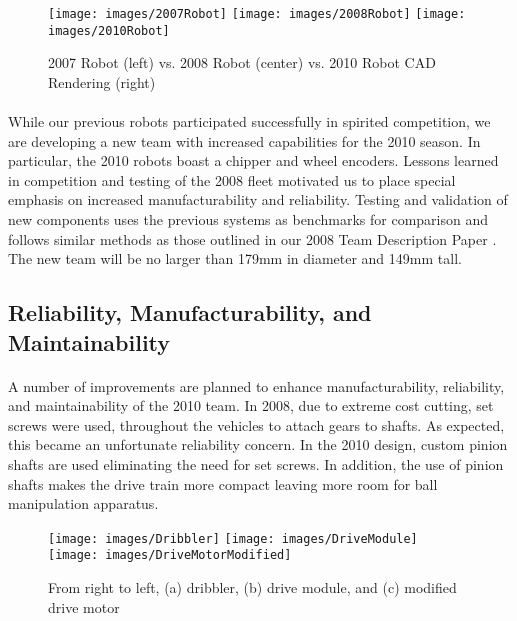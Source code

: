 \documentclass{llncs}
\begin{document}
\begin{figure} 
	\centering
	\vspace {0 cm}
	\texttt{[image: images/2007Robot]}
	\texttt{[image: images/2008Robot]}
	\texttt{[image: images/2010Robot]}
	\caption{2007 Robot (left) vs. 2008 Robot (center) vs. 2010 Robot CAD Rendering (right)}
	\label{fig:RobotComparison}
\end{figure}


\paragraph{}
While our previous robots participated successfully in spirited competition, we are developing a new team with increased capabilities for the 2010 season. In particular, the 2010 robots boast a chipper and wheel encoders. Lessons learned in competition and testing of the 2008 fleet motivated us to place special emphasis on increased manufacturability and reliability. Testing and validation of new components uses the previous systems as benchmarks for comparison and follows similar methods as those outlined in our 2008 Team Description Paper \cite{robocup08tdp}. The new team will be no larger than 179mm in diameter and 149mm tall.

\subsection{Reliability, Manufacturability, and Maintainability}
\paragraph{}
A number of improvements are planned to enhance manufacturability, reliability, and maintainability of the 2010 team. In 2008, due to extreme cost cutting, set screws were used, throughout the vehicles to attach gears to shafts. As expected, this became an unfortunate reliability concern. In the 2010 design, custom pinion shafts are used eliminating the need for set screws. In addition, the use of pinion shafts makes the drive train more compact leaving more room for ball manipulation apparatus.

\begin{figure} 
	\centering
	\vspace {0 cm}
	\texttt{[image: images/Dribbler]}
	\texttt{[image: images/DriveModule]}
	\texttt{[image: images/DriveMotorModified]}
	\caption{From right to left, (a) dribbler, (b) drive module, and (c) modified drive motor}
	\label{fig:SimplifiedAssembly}
\end{figure}
\end{document}

